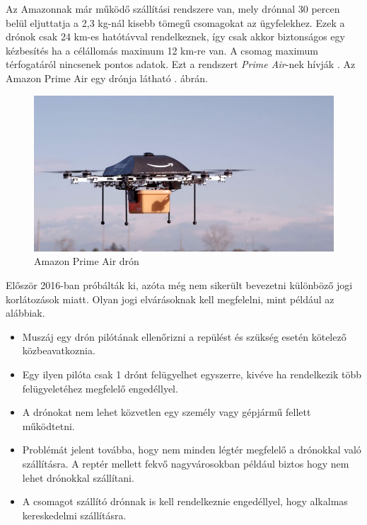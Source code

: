 

Az Amazonnak már működő szállítási rendszere van, mely drónnal 30 percen belül eljuttatja a 2,3 kg-nál kisebb tömegű csomagokat az ügyfelekhez.
Ezek a drónok csak 24 km-es hatótávval rendelkeznek, így csak akkor biztonságos egy kézbesítés ha a célállomás maximum 12 km-re van.
A csomag maximum térfogatáról nincsenek pontos adatok.
Ezt a rendszert \textit{Prime Air}-nek hívják \cite{prime-air}. Az Amazon Prime Air egy drónja látható . ábrán.

\begin{figure}[h]
    \centering
    \includegraphics[scale=0.4]{images/prime.jpg}
    \caption{Amazon Prime Air drón}
    \label{fig:prime}
\end{figure}

Először 2016-ban próbálták ki, azóta még nem sikerült bevezetni különböző jogi korlátozások miatt. Olyan jogi elvárásoknak kell megfelelni, mint például az alábbiak.
\begin{itemize}
    \item Muszáj egy drón pilótának ellenőrizni a repülést és szükség esetén kötelező közbeavatkoznia.
    \item Egy ilyen pilóta csak 1 drónt felügyelhet egyszerre, kivéve ha rendelkezik több felügyeletéhez megfelelő engedéllyel.
    \item A drónokat nem lehet közvetlen egy személy vagy gépjármű fellett működtetni.
    \item Problémát jelent továbba, hogy nem minden légtér megfelelő a drónokkal való szállításra. A reptér mellett fekvő nagyvárosokban például biztos hogy nem lehet drónokkal szállítani.
    \item A csomagot szállító drónnak is kell rendelkeznie engedéllyel, hogy alkalmas kereskedelmi szállításra.
\end{itemize}

